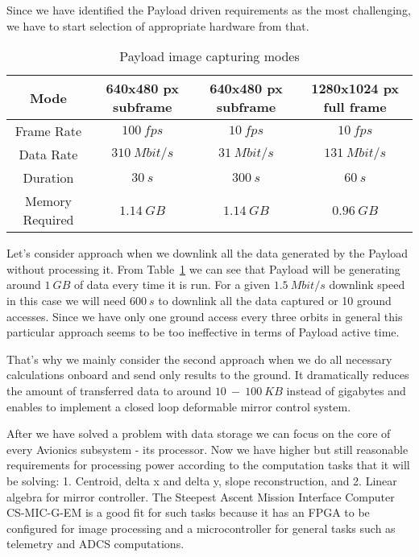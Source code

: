 \documentclass[12pt]{article}
\begin{document}
Since we have identified the Payload driven requirements as the most challenging, we have to start selection of appropriate hardware from that.

\begin{table}[ht]
\caption{Payload image capturing modes}
\begin{center}
    \begin{tabular}{| c || c | c | c |} \hline
    	Mode & 640x480 px subframe &  640x480 px subframe & 1280x1024 px  full frame \\ \hline \hline
    Frame Rate & $100\ fps$ & $10\ fps$ & $10\ fps$ \\
    Data Rate & $310\ Mbit/s$ & $31\ Mbit/s$ & $131\ Mbit/s$ \\
    Duration & $30\ s$ & $300\ s$ & $60\ s$ \\
    Memory Required & $1.14\ GB$ & $1.14\ GB$ & $0.96\ GB$ \\ \hline 
    \end{tabular}
\end{center}
\label{table:avionics_modes}
\end{table}

Let’s consider approach when we downlink all the data generated by the Payload without processing it. From Table~\ref{table:avionics_modes} we can see that Payload will be generating around $1\ GB$ of data every time it is run. For a given $1.5\ Mbit/s$ downlink speed in this case we will need $600\ s$ to downlink all the data captured or 10 ground accesses. Since we have only one ground access every three orbits in general this particular approach seems to be too ineffective in terms of Payload active time. 

That’s why we mainly consider the second approach when we do all necessary calculations onboard and send only results to the ground. It dramatically reduces the amount of transferred data to around $10\ -\ 100\ KB$ instead of gigabytes and enables to implement a closed loop deformable mirror control system.

After we have solved a problem with data storage we can focus on the core of every Avionics subsystem - its processor. Now we have higher but still reasonable requirements for processing power according to the computation tasks that it will be solving: 1. Centroid, delta x and delta y, slope reconstruction, and 2. Linear algebra for mirror controller.
The Steepest Ascent Mission Interface Computer CS-MIC-G-EM is a good fit for such tasks because it has an FPGA to be configured for image processing and a microcontroller for general tasks such as telemetry and ADCS computations.
\end{document}
